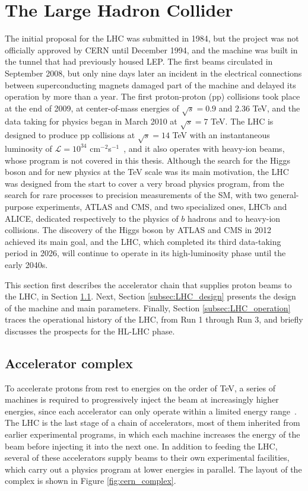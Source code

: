 \section{The Large Hadron Collider}
\label{sec:LHC}
%
The initial proposal for the LHC was submitted in 1984, but the project was not officially approved by CERN until December 1994, and the machine was built in the tunnel that had previously housed LEP. The first beams circulated in September 2008, but only nine days later an incident in the electrical connections between superconducting magnets damaged part of the machine and delayed its operation by more than a year. The first proton-proton (pp) collisions took place at the end of 2009, at center-of-mass energies of $\sqrt{s}=0.9$ and $2.36$ TeV, and the data taking for physics began in March 2010 at $\sqrt{s}=7$ TeV. The LHC is designed to produce pp collisions at $\sqrt{s}=14$ TeV with an instantaneous luminosity of $\mathcal{L}=10^{34}$ cm$^{-2}$s$^{-1}$~\cite{Evans:2008zzb}, and it also operates with heavy-ion beams, whose program is not covered in this thesis. Although the search for the Higgs boson and for new physics at the TeV scale was its main motivation, the LHC was designed from the start to cover a very broad physics program, from the search for rare processes to precision measurements of the SM, with two general-purpose experiments, ATLAS and CMS, and two specialized ones, LHCb and ALICE, dedicated respectively to the physics of $b$ hadrons and to heavy-ion collisions. The discovery of the Higgs boson by ATLAS and CMS in 2012~\cite{ATLAS:2012yve,CMS:2012qbp} achieved its main goal, and the LHC, which completed its third data-taking period in 2026, will continue to operate in its high-luminosity phase until the early 2040s.


This section first describes the accelerator chain that supplies proton beams to the LHC, in Section \ref{subsec:LHC_complex}. Next, Section \ref{subsec:LHC_design} presents the design of the machine and main parameters. Finally, Section \ref{subsec:LHC_operation} traces the operational history of the LHC, from Run 1 through Run 3, and briefly discusses the prospects for the HL-LHC phase.


\subsection{Accelerator complex}
\label{subsec:LHC_complex}
%
To accelerate protons from rest to energies on the order of TeV, a series of machines is required to progressively inject the beam at increasingly higher energies, since each accelerator can only operate within a limited energy range~\cite{Benedikt:2004wm,Vretenar:2020quc}. The LHC is the last stage of a chain of accelerators, most of them inherited from earlier experimental programs, in which each machine increases the energy of the beam before injecting it into the next one. In addition to feeding the LHC, several of these accelerators supply beams to their own experimental facilities, which carry out a physics program at lower energies in parallel. The layout of the complex is shown in Figure \ref{fig:cern_complex}.

